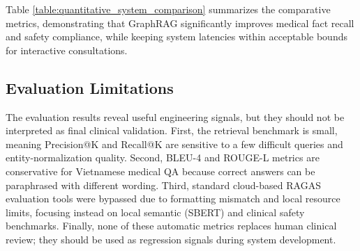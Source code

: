 \documentclass[../main.tex]{subfiles}
\begin{document}
Table \ref{table:quantitative_system_comparison} summarizes the comparative metrics, demonstrating that GraphRAG significantly improves medical fact recall and safety compliance, while keeping system latencies within acceptable bounds for interactive consultations.

\begin{table}[H]
\centering
{}
\caption{Quantitative comparison results between GraphRAG (Custom KG) and Direct LLM (Baseline) on 50 clinical QA cases}
\label{table:quantitative_system_comparison}
\end{table}

\subsection{Evaluation Limitations}
The evaluation results reveal useful engineering signals, but they should not be interpreted as final clinical validation. First, the retrieval benchmark is small, meaning Precision@K and Recall@K are sensitive to a few difficult queries and entity-normalization quality. Second, BLEU-4 and ROUGE-L metrics are conservative for Vietnamese medical QA because correct answers can be paraphrased with different wording. Third, standard cloud-based RAGAS evaluation tools were bypassed due to formatting mismatch and local resource limits, focusing instead on local semantic (SBERT) and clinical safety benchmarks. Finally, none of these automatic metrics replaces human clinical review; they should be used as regression signals during system development.
\end{document}
